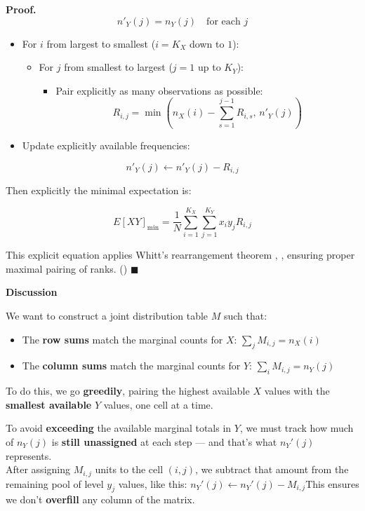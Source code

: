 \documentclass[
  12pt,
]{article}
\providecommand{\tightlist}{%
  \setlength{\itemsep}{0pt}\setlength{\parskip}{0pt}}
\theoremstyle{plain}
\theoremstyle{definition}
\renewenvironment{proof}
   {\par\noindent\textbf{Proof.}\ }
   {\hfill$\blacksquare$\par}
\theoremstyle{remark}
\begin{document}
\begin{proof}
\[n'_Y(j)=n_Y(j)\quad\text{for each }j\]

\begin{itemize}
\item
  For \(i\) from largest to smallest (\(i=K_X\) down to \(1\)):

  \begin{itemize}
  \tightlist
  \item
    For \(j\) from smallest to largest (\(j=1\) up to \(K_Y\)):

    \begin{itemize}
    \tightlist
    \item
      Pair explicitly as many observations as possible:
      \[R_{i,j}=\min\left(n_X(i)-\sum_{s=1}^{j-1}R_{i,s},\, n'_Y(j)\right)\]
    \end{itemize}
  \end{itemize}
\item
  Update explicitly available frequencies:
\end{itemize}

\[n'_Y(j)\leftarrow n'_Y(j)-R_{i,j}\]

Then explicitly the minimal expectation is:

\[E[XY]_{\text{min}}=\frac{1}{N}\sum_{i=1}^{K_X}\sum_{j=1}^{K_Y} x_i y_j R_{i,j}\]

This explicit equation applies Whitt's rearrangement theorem ,
\textcite{whit76-bivariate} , ensuring proper maximal pairing of ranks.
(\textcite{whit76-bivariate})
\end{proof}

\textbf{Discussion}

We want to construct a joint distribution table \(M\) such that:

\begin{itemize}
\item
  The \textbf{row sums} match the marginal counts for \(X\):
  \(\sum_j M_{i,j} = n_X(i)\)
\item
  The \textbf{column sums} match the marginal counts for \(Y\):
  \(\sum_i M_{i,j} = n_Y(j)\)
\end{itemize}

To do this, we go \textbf{greedily}, pairing the highest available \(X\)
values with the \textbf{smallest available} \(Y\) values, one cell at a
time.

To avoid \textbf{exceeding} the available marginal totals in \(Y\), we
must track how much of \(n_Y(j)\) is \textbf{still unassigned} at each
step --- and that's what \(n_Y'(j)\) represents.\\
After assigning \(M_{i,j}\) units to the cell \((i,j)\), we subtract
that amount from the remaining pool of level \(y_j\) values, like this:
\(n_Y'(j) \leftarrow n_Y'(j) - M_{i,j}\)This ensures we don't
\textbf{overfill} any column of the matrix.
\end{document}
